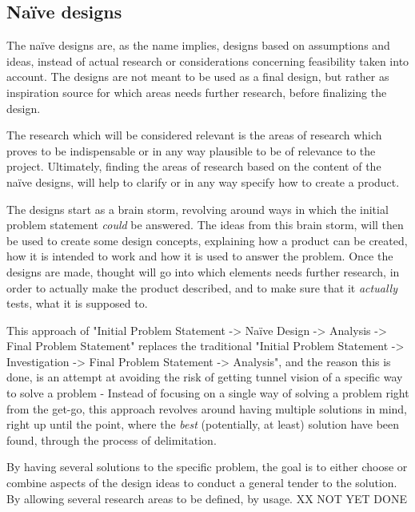 
\subsection{Naïve designs}
The naïve designs are, as the name implies, designs based on assumptions and ideas, instead of actual research or considerations concerning feasibility taken into account. The designs are not meant to be used as a final design, but rather as inspiration source for which areas needs further research, before finalizing the design.

The research which will be considered relevant is the areas of research which proves to be indispensable or in any way plausible to be of relevance to the project. Ultimately, finding the areas of research based on the content of the naïve designs, will help to clarify or in any way specify how to create a product.
\bigskip

The designs start as a brain storm, revolving around ways in which the initial problem statement \textit{could} be answered. The ideas from this brain storm, will then be used to create some design concepts, explaining how a product can be created, how it is intended to work and how it is used to answer the problem. Once the designs are made, thought will go into which elements needs further research, in order to actually make the product described, and to make sure that it \textit{actually} tests, what it is supposed to.
\bigskip

This approach of "Initial Problem Statement -> Naïve Design -> Analysis -> Final Problem Statement" replaces the traditional "Initial Problem Statement -> Investigation -> Final Problem Statement -> Analysis", and the reason this is done, is an attempt at avoiding the risk of getting tunnel vision of a specific way to solve a problem - Instead of focusing on a single way of solving a problem right from the get-go, this approach revolves around having multiple solutions in mind, right up until the point, where the \textit{best} (potentially, at least) solution have been found, through the process of delimitation. 

By having several solutions to the specific problem, the goal is to either choose or combine aspects of the design ideas to conduct a general tender to the solution. By allowing several research areas to be defined, by usage. XX NOT YET DONE
